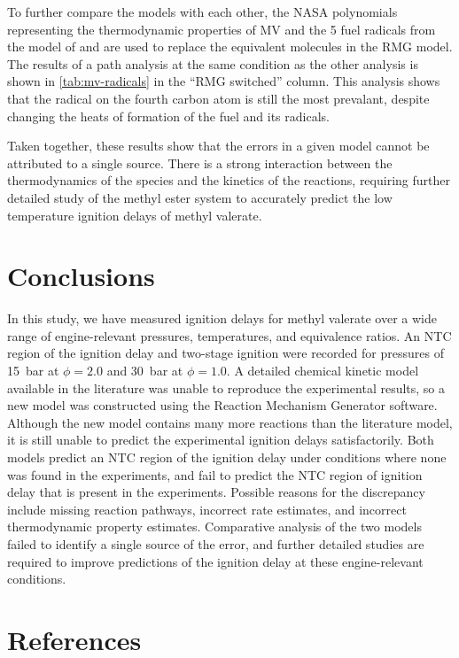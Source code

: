 \documentclass[letterpaper, review]{elsarticle}
\begin{document}
To further compare the models with each other, the NASA polynomials representing the thermodynamic
properties of MV and the 5 fuel radicals from the model of \citet{Dievart2013} and are used to
replace the equivalent molecules in the RMG model. The results of a path analysis at the same
condition as the other analysis is shown in \cref{tab:mv-radicals} in the ``RMG switched'' column.
This analysis shows that the radical on the fourth carbon atom is still the most prevalant, despite
changing the heats of formation of the fuel and its radicals.

Taken together, these results show that the errors in a given model cannot be attributed to a single
source. There is a strong interaction between the thermodynamics of the species and the kinetics of
the reactions, requiring further detailed study of the methyl ester system to accurately predict the
low temperature ignition delays of methyl valerate.

\section{Conclusions}\label{sec:conclusions}

In this study, we have measured ignition delays for methyl valerate over a wide range of
engine-relevant pressures, temperatures, and equivalence ratios. An NTC region of the ignition delay
and two-stage ignition were recorded for pressures of \SI{15}{\bar} at \(\phi=2.0\) and
\SI{30}{\bar} at \(\phi=1.0\). A detailed chemical kinetic model available in the literature was
unable to reproduce the experimental results, so a new model was constructed using the Reaction
Mechanism Generator software. Although the new model contains many more reactions than the
literature model, it is still unable to predict the experimental ignition delays satisfactorily.
Both models predict an NTC region of the ignition delay under conditions where none was found in the
experiments, and fail to predict the NTC region of ignition delay that is present in the
experiments. Possible reasons for the discrepancy include missing reaction pathways, incorrect rate
estimates, and incorrect thermodynamic property estimates. Comparative analysis of the two models
failed to identify a single source of the error, and further detailed studies are required to
improve predictions of the ignition delay at these engine-relevant conditions.

\section*{References}

\end{document}
